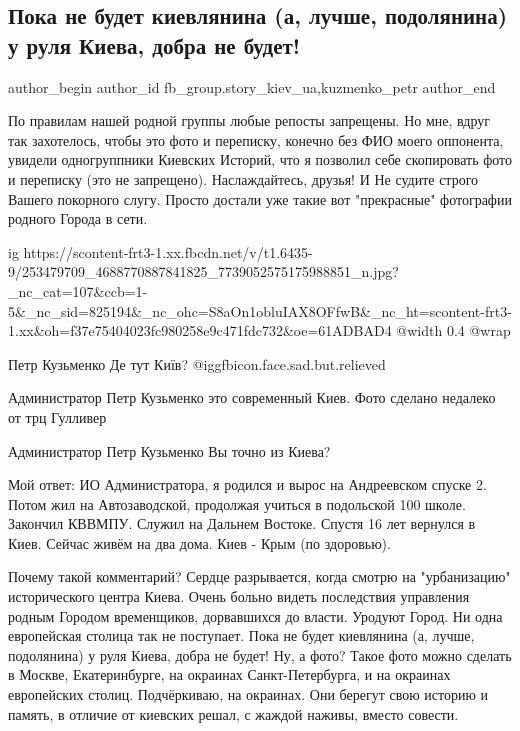  
 
 
 
 
 
\subsection{Пока не будет киевлянина (а, лучше, подолянина) у руля Киева, добра не будет!}
\label{sec:05_11_2021.fb.fb_group.story_kiev_ua.6.kiev_gorod_foto}
 
\ifcmt
 author_begin
   author_id fb_group.story_kiev_ua,kuzmenko_petr
 author_end
\fi

По правилам нашей родной группы любые репосты запрещены. Но мне, вдруг так
захотелось, чтобы это фото и переписку, конечно без ФИО моего оппонента,
увидели одногруппники Киевских Историй, что я позволил себе скопировать фото и
переписку (это не запрещено). Наслаждайтесь, друзья! И Не судите строго Вашего
покорного слугу. Просто достали уже такие вот "прекрасные" фотографии родного
Города в сети.

\ifcmt
  ig https://scontent-frt3-1.xx.fbcdn.net/v/t1.6435-9/253479709_4688770887841825_7739052575175988851_n.jpg?_nc_cat=107&ccb=1-5&_nc_sid=825194&_nc_ohc=S8aOn1obluIAX8OFfwB&_nc_ht=scontent-frt3-1.xx&oh=f37e75404023fc980258e9c471fdc732&oe=61ADBAD4
  @width 0.4
  @wrap 
\fi

Петр Кузьменко Де тут Київ? @igg{fbicon.face.sad.but.relieved}  

Администратор Петр Кузьменко это современный Киев. Фото сделано недалеко от трц Гулливер

Администратор Петр Кузьменко Вы точно из Киева? 

Мой ответ: ИО Администратора, я родился и вырос на Андреевском спуске 2.
Потом жил на Автозаводской, продолжая учиться в подольской 100 школе.
Закончил КВВМПУ. Служил на Дальнем Востоке. Спустя 16 лет вернулся в Киев.
Сейчас живём на два дома. Киев - Крым (по здоровью). 

Почему такой комментарий? Сердце разрывается, когда смотрю на "урбанизацию"
исторического центра Киева. Очень больно видеть последствия управления родным
Городом временщиков, дорвавшихся до власти. Уродуют Город. Ни одна европейская
столица так не поступает. Пока не будет киевлянина (а, лучше, подолянина) у
руля Киева, добра не будет! Ну, а фото? Такое фото можно сделать в Москве,
Екатеринбурге, на окраинах Санкт-Петербурга, и на окраинах европейских столиц.
Подчёркиваю, на окраинах. Они берегут свою историю и память, в отличие от
киевских решал, с жаждой наживы, вместо совести.

